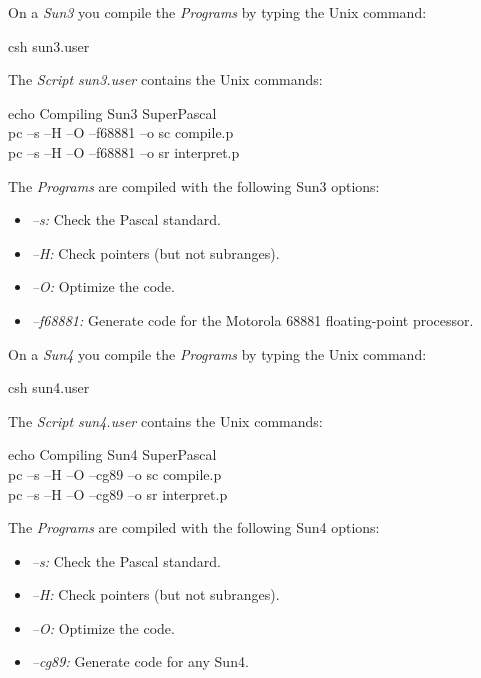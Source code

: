 On a {\it Sun3} you compile the {\it Programs} by typing the
Unix command:

\begin{center}
  csh sun3.user
\end{center}

The {\it Script sun3.user} contains the Unix commands:

\begin{program}{16.7em}
  {\PA}echo Compiling Sun3 SuperPascal           \\
  {\PA}pc --s --H --O --f68881 --o sc compile.p  \\
  {\PA}pc --s --H --O --f68881 --o sr interpret.p\\
\end{program}

The {\it Programs} are compiled with the following Sun3
options:

\begin{itemize}
  \item
  {\it --s:} Check the Pascal standard.
  \item
  {\it --H:} Check pointers (but not subranges).
  \item
  {\it --O:} Optimize the code.
  \item
  {\it --f68881:} Generate code for the Motorola 68881
  floating-point processor.
\end{itemize}

On a {\it Sun4} you compile the {\it Programs} by typing
the Unix command:

\begin{center}
  csh sun4.user
\end{center}

The {\it Script sun4.user} contains the Unix commands:

\begin{program}{15.7em}
  {\PA}echo Compiling Sun4 SuperPascal         \\
  {\PA}pc --s --H --O --cg89 --o sc compile.p  \\
  {\PA}pc --s --H --O --cg89 --o sr interpret.p\\
\end{program}

The {\it Programs} are compiled with the following Sun4
options:

\begin{itemize}
  \item
  {\it --s:} Check the Pascal standard.
  \item
  {\it --H:} Check pointers (but not subranges).
  \item
  {\it --O:} Optimize the code.
  \item
  {\it --cg89:} Generate code for any Sun4.
\end{itemize}

